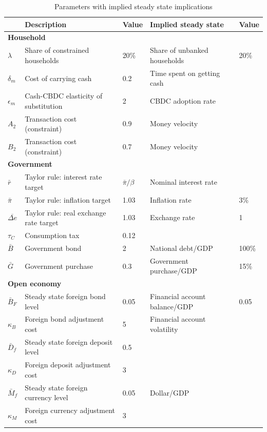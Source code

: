 \documentclass[12pt]{article}
\begin{document}
\begin{table}[h!]
\centering
\begin{tabular}{lllll}
\hline\hline
& Description & Value & Implied steady state & Value \\\hline
\multicolumn{5}{l}{\bf Household}     \\
$\lambda$  & Share of constrained households  & 20\%  & Share of unbanked households & 20\%  \\
$\delta_m$ & Cost of carrying cash & 0.2 & Time spent on getting cash \\
$\epsilon_m$ & Cash-CBDC elasticity of substitution &  2 & CBDC adoption rate \\
$A_2$      & Transaction cost (constraint)   & 0.9     & Money velocity     	     \\
$B_2$     & Transaction cost (constraint)   & 0.7      & Money velocity           \\
\multicolumn{5}{l}{\bf Government}     \\
$\bar{r}$     & Taylor rule: interest rate target            & $\bar{\pi}/\beta$    & Nominal interest rate &      	 \\
$\bar{\pi}$     & Taylor rule: inflation target       & 1.03        & Inflation rate & 3\%                        				 \\
$\overline{\Delta e}$    & Taylor rule: real exchange rate target       & 1.03   & Exchange rate & 1    			  \\
$\tau_C$ & Consumption tax & 0.12 &  \\
$\bar{B}$ & Government bond & 2 & National debt/GDP & 100\% \\
$\bar{G}$ & Government purchase & 0.3 & Government purchase/GDP & 15\% \\
\multicolumn{5}{l}{\bf Open economy}                                                            \\
$\bar{B}_F$       & Steady state foreign bond level    & 0.05     & Financial account balance/GDP &      0.05              \\
$\kappa_B$     & Foreign bond adjustment cost    & 5       & Financial account volatility &                                       \\
$\bar{D}_f$       & Steady state foreign deposit level   & 0.5  \\
$\kappa_D$      & Foreign deposit adjustment cost     & 3                                         \\
$\bar{M}_f$      & Steady state foreign currency level     & 0.05  &  Dollar/GDP     \\
$\kappa_M$     & Foreign currency adjustment cost     & 3                                         \\      \hline                                    
\end{tabular}
\caption{Parameters with implied steady state implications}
\end{table}
\end{document}

